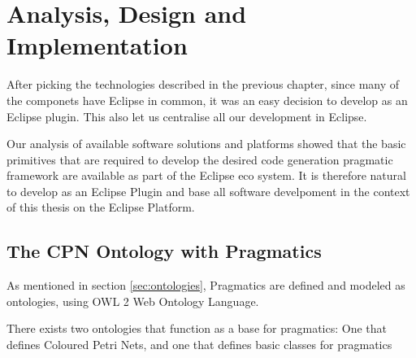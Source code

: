 \chapter{Analysis, Design and Implementation}
\label{chap:analysis}


After picking the technologies described in the previous chapter, since many of
the componets have Eclipse in common, it was an easy decision to develop
\thename{} as an Eclipse plugin. This also let us centralise all our development
in Eclipse.

Our analysis of available software solutions and platforms showed that the basic
primitives that are required to develop the desired code generation pragmatic
framework are available as part of the Eclipse eco system. It is therefore
natural to develop \thename{} as an Eclipse Plugin and base all software
develpoment in the context of this thesis on the Eclipse Platform.


\section{The CPN Ontology with Pragmatics}
As mentioned in section \ref{sec:ontologies}, Pragmatics are defined and modeled
as ontologies, using OWL 2 Web Ontology Language.  

There exists two ontologies that function as a base for pragmatics: One that
defines Coloured Petri Nets, and one that defines basic classes for pragmatics

